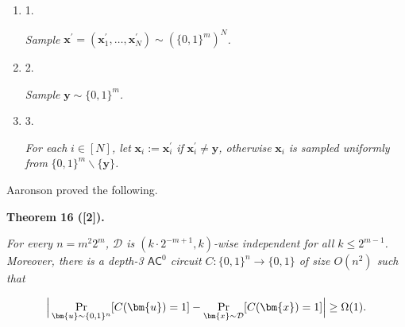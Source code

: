 \begin{enumerate}


\item[] 
1. 


\emph{Sample }$\bm{x}^{\prime}=(\bm{x}^{\prime}_{1},\ldots,\bm{x}^{\prime}_{N})\sim(\{0,1\}^{m})^{N}$\emph{.}\par





\item[] 
2. 


\emph{Sample }$\bm{y}\sim\{0,1\}^{m}$\emph{.}\par





\item[] 
3. 


\emph{For each }$i\in[N]$\emph{, let }$\bm{x}_{i}:=\bm{x}^{\prime}_{i}$\emph{ if }$\bm{x}^{\prime}_{i}\neq\bm{y}$\emph{, otherwise }$\bm{x}_{i}$\emph{ is sampled uniformly from
}$\{0,1\}^{m}\smallsetminus\{\bm{y}\}$\emph{.}\par





\end{enumerate}






Aaronson proved the following.\par





\par\medskip\noindent\textbf{
\textbf{Theorem 16}\textbf{ }([2])\textbf{.}
}\par



\emph{For every $n=m^{2}2^{m}$, $\mathcal{D}$ is $(k\cdot 2^{-m+1},k)$-wise independent for all $k\leq 2^{m-1}$. Moreover, there is a depth-3 $\textsf{AC}^{0}$ circuit $C\colon\{0,1\}^{n}\to\{0,1\}$ of size $O(n^{2})$ such that}\par


\[\begin{gathered}
\Big{|}\Pr_{\bm{u}\sim\{0,1\}^{n}}[C(\bm{u})=1]-\Pr_{\bm{x}\sim\mathcal{D}}[C(\bm{x})=1]\Big{|}\geq\Omega(1).
\end{gathered}\]




